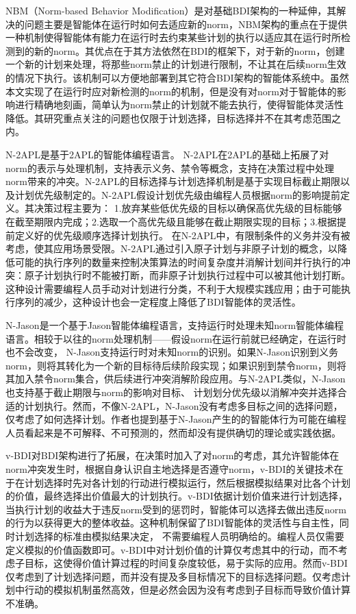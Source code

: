 NBM（Norm-based Behavior Modification）\cite{DBLP:conf/atal/MeneguzziL09}是对基础BDI架构的一种延伸，其解决的问题主要是智能体在运行时如何去适应新的norm，NBM架构的重点在于提供一种机制使得智能体有能力在运行时去约束某些计划的执行以适应其在运行时所检测到的新的norm。其优点在于其方法依然在BDI的框架下，对于新的norm，创建一个新的计划来处理，将那些norm禁止的计划进行限制，不让其在后续norm生效的情况下执行。该机制可以方便地部署到其它符合BDI架构的智能体系统中。虽然本文实现了在运行时应对新检测的norm的机制，但是没有对norm对于智能体的影响进行精确地刻画，简单认为norm禁止的计划就不能去执行，使得智能体灵活性降低。其研究重点关注的问题也仅限于计划选择，目标选择并不在其考虑范围之内。

N-2APL\cite{DBLP:conf/aamas/AlechinaDL12}是基于2APL\cite{DBLP:journals/aamas/Dastani08}的智能体编程语言。 N-2APL在2APL的基础上拓展了对norm的表示与处理机制，支持表示义务、禁令等概念，支持在决策过程中处理norm带来的冲突。N-2APL的目标选择与计划选择机制是基于实现目标截止期限以及计划优先级制定的。N-2APL假设计划优先级由编程人员根据norm的影响提前定义。其决策过程主要为： 1.放弃某些低优先级的目标以确保高优先级的目标能够在截至期限内完成；2.选取一个高优先级且能够在截止期限实现的目标；3.根据提前定义好的优先级顺序选择计划执行。
在N-2APL中，有限制条件的义务并没有被考虑，使其应用场景受限。N-2APL通过引入原子计划与非原子计划的概念，以降低可能的执行序列的数量来控制决策算法的时间复杂度并消解计划间并行执行的冲突：原子计划执行时不能被打断，而非原子计划执行过程中可以被其他计划打断。这种设计需要编程人员手动对计划进行分类，不利于大规模实践应用；由于可能执行序列的减少，这种设计也会一定程度上降低了BDI智能体的灵活性。

N-Jason\cite{DBLP:conf/dalt/LeePLDA14}是一个基于Jason\cite{bordini2007programming}智能体编程语言，支持运行时处理未知norm智能体编程语言。相较于以往的norm处理机制——假设norm在运行前就已经确定，在运行时也不会改变， N-Jason支持运行时对未知norm的识别。如果N-Jason识别到义务norm，则将其转化为一个新的目标待后续阶段实现；如果识别到禁令norm，则将其加入禁令norm集合，供后续进行冲突消解阶段应用。与N-2APL类似，N-Jason 也支持基于截止期限与norm的影响对目标、 计划划分优先级以消解冲突并选择合适的计划执行。然而，不像N-2APL，N-Jason没有考虑多目标之间的选择问题，仅考虑了如何选择计划。作者也提到基于N-Jason产生的的智能体行为可能在编程人员看起来是不可解释、不可预测的，然而却没有提供确切的理论或实践依据。

v-BDI\cite{DBLP:journals/eaai/MeneguzziROVL15}对BDI架构进行了拓展，在决策时加入了对norm的考虑，其允许智能体在norm冲突发生时，根据自身认识自主地选择是否遵守norm，v-BDI的关键技术在于在计划选择时先对各计划的行动进行模拟运行，然后根据模拟结果对比各个计划的价值，最终选择出价值最大的计划执行。v-BDI依据计划价值来进行计划选择， 当执行计划的收益大于违反norm受到的惩罚时，智能体可以选择去做出违反norm的行为以获得更大的整体收益。这种机制保留了BDI智能体的灵活性与自主性，同时计划选择的标准由模拟结果决定， 不需要编程人员明确给的。编程人员仅需要定义模拟的价值函数即可。v-BDI中对计划价值的计算仅考虑其中的行动，而不考虑子目标，这使得价值计算过程的时间复杂度较低，易于实际的应用。然而v-BDI仅考虑到了计划选择问题，而并没有提及多目标情况下的目标选择问题。仅考虑计划中行动的模拟机制虽然高效，但是必然会因为没有考虑到子目标而导致价值计算不准确。

